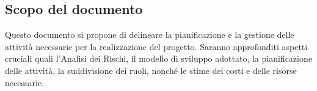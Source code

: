 \subsection{Scopo del documento}
Questo documento si propone di delineare la pianificazione e la gestione delle attività necessarie per la realizzazione del progetto. Saranno approfonditi aspetti cruciali quali l'Analisi dei Rischi, il modello di sviluppo adottato, la pianificazione delle attività, la suddivisione dei ruoli, nonché le stime dei costi e delle risorse necessarie.